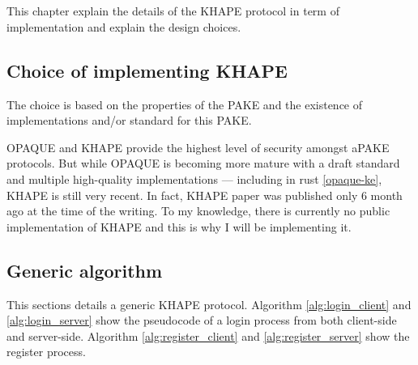 \documentclass[../report.tex]{subfiles}
\begin{document}
\chapter{} \label{cha:khape}

This chapter explain the details of the KHAPE protocol in term of implementation and explain the design choices.

\section{Choice of implementing KHAPE}

The choice is based on the properties of the PAKE and the existence of implementations and/or standard for this PAKE.

OPAQUE and KHAPE provide the highest level of security amongst aPAKE protocols.
But while OPAQUE is becoming more mature with a draft standard and multiple high-quality implementations --- including in rust \ref{opaque-ke}, KHAPE is still very recent.
In fact, KHAPE paper was published only 6 month ago at the time of the writing. To my knowledge, there is currently no public implementation of KHAPE and this is why I will be implementing it.

\section{Generic algorithm} \label{sec:khape_generic_algo}
This sections details a generic KHAPE protocol.
Algorithm \ref{alg:login_client} and \ref{alg:login_server} show the pseudocode of a login process from both client-side and server-side. Algorithm \ref{alg:register_client} and \ref{alg:register_server} show the register process.
\end{document}
